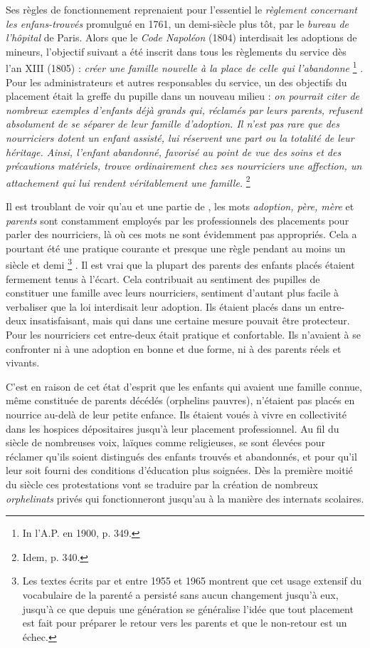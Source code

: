 Ses règles de fonctionnement reprenaient pour l'essentiel le \emph{règlement concernant les enfans-trouvés} promulgué en 1761, un demi-siècle plus tôt, par le \emph{bureau de l'hôpital} de Paris. Alors que le \emph{Code Napoléon} (1804) interdisait les adoptions de mineurs, l'objectif suivant a été inscrit dans tous les règlements du service dès l'an XIII (1805) : \emph{créer une famille nouvelle à la place de celle qui l'abandonne}%
\footnote{In l'A.P. en 1900, p. 349.}%
. Pour les administrateurs et autres responsables du service, un des objectifs du placement était la greffe du pupille dans un nouveau milieu : \emph{on pourrait citer de nombreux exemples d'enfants déjà grands qui, réclamés par leurs parents, refusent absolument de se séparer de leur famille d'adoption. Il n'est pas rare que des nourriciers dotent un enfant assisté, lui réservent une part ou la totalité de leur héritage. Ainsi, l'enfant abandonné, favorisé au point de vue des soins et des précautions matériels, trouve ordinairement chez ses nourriciers une affection, un attachement qui lui rendent véritablement une famille.}%
\footnote{Idem, p. 340.} 

 Il est troublant de voir qu'au  et une partie de , les mots \emph{adoption, père, mère} et \emph{parents} sont constamment employés par les professionnels des placements pour parler des nourriciers, là où ces mots ne sont évidemment pas appropriés. Cela a pourtant été une pratique courante et presque une règle pendant au moins un siècle et demi%
\footnote{Les textes écrits par  et  entre 1955 et 1965 montrent que cet usage extensif du vocabulaire de la parenté a persisté sans aucun changement jusqu'à eux, jusqu'à ce que depuis une génération se généralise l'idée que tout placement est fait pour préparer le retour vers les parents et que le non-retour est un échec.}%
. Il est vrai que la plupart des parents des enfants placés étaient fermement tenus à l'écart. Cela contribuait au sentiment des pupilles de constituer une famille avec leurs nourriciers, sentiment d'autant plus facile à verbaliser que la loi interdisait leur adoption. Ils étaient placés dans un entre-deux insatisfaisant, mais qui dans une certaine mesure pouvait être protecteur. Pour les nourriciers cet entre-deux était pratique et confortable. Ils n'avaient à se confronter ni à une adoption en bonne et due forme, ni à des parents réels et vivants. 

 C'est en raison de cet état d'esprit que les enfants qui avaient une famille connue, même constituée de parents décédés (orphelins pauvres), n'étaient pas placés en nourrice au-delà de leur petite enfance. Ils étaient voués à vivre en collectivité dans les hospices dépositaires jusqu'à leur placement professionnel. Au fil du siècle de nombreuses voix, laïques comme religieuses, se sont élevées pour réclamer qu'ils soient distingués des enfants trouvés et abandonnés, et pour qu'il leur soit fourni des conditions d'éducation plus soignées. Dès la première moitié du siècle ces protestations vont se traduire par la création de nombreux \emph{orphelinats} privés qui fonctionneront jusqu'au  à la manière des internats scolaires. 

